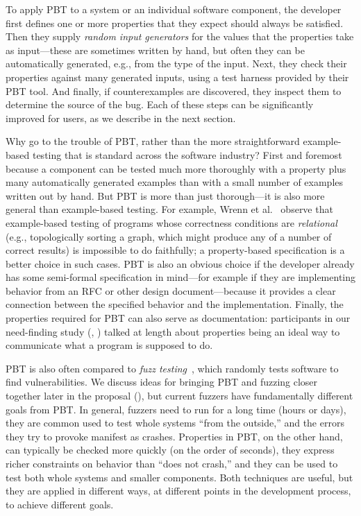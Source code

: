 To apply PBT to a system or an individual software component, the
developer first defines one
or more properties that they expect should always be satisfied. Then
they supply {\em random input generators} for the values that the
properties take as input---these are sometimes written by hand, but
often they can be automatically generated, e.g., from the type of the
input. Next, they check their properties against many generated
inputs, using a test harness provided by their PBT tool. And finally, if
counterexamples are discovered, they inspect them to determine the
source of the bug.  Each of these steps can be significantly improved for users,
as we describe in the next section.

\smallskip

Why go to the trouble of PBT, rather than the more straightforward
example-based testing that is standard across the software industry?
First and foremost because a component can be tested much more
thoroughly with a property plus many automatically generated examples
than with a small number of examples written out by hand.
But
PBT is more than just thorough---it is also more general than example-based
testing. For example, Wrenn et al.~\cite{wrenn2021using} observe that example-based testing
of programs whose correctness conditions are {\em relational} (e.g.,
topologically sorting a graph, which might
produce any of a number of correct results) is impossible to do
faithfully; a property-based specification is a better choice in
such cases.
PBT is also
an obvious choice if
the developer already has some semi-formal
specification in mind---for example if they are implementing behavior from an RFC or
other design document---because it provides a clear connection between the
specified behavior and the implementation.
Finally, the
properties required for PBT can also serve as documentation:
participants in our need-finding study (, )
talked at length about properties being an ideal way to communicate what a
program is supposed to do.

PBT is also often compared to {\em fuzz testing}~\cite{afl-readme},
which randomly tests software to find
vulnerabilities. We discuss ideas for bringing PBT and
fuzzing closer together later in the proposal
(), but current fuzzers have fundamentally
different goals from PBT.  In general, fuzzers need to run for a long time (hours or
days), they are common used to test whole systems ``from the
outside,'' and the errors they try to provoke manifest as
crashes. Properties in PBT, on the other hand, can typically be
checked more quickly (on the order of seconds), they express richer
constraints on behavior than ``does not crash,'' and they can be used
to test both whole systems and smaller components.  Both techniques are useful, but
they are applied in different ways, at different points in the
development process, to achieve different goals.


